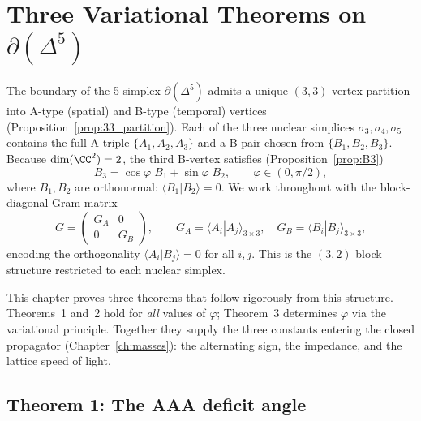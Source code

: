 \section{Three Variational Theorems on $\partial(\Delta^5)$}
\label{ch:variational_theorems}

The boundary of the 5-simplex $\partial(\Delta^5)$ admits a unique
$(3,3)$ vertex partition into A-type (spatial) and B-type (temporal)
vertices (Proposition~\ref{prop:33_partition}).  Each of the three
nuclear simplices $\sigma_3, \sigma_4, \sigma_5$ contains the full
A-triple $\{A_1, A_2, A_3\}$ and a B-pair chosen from
$\{B_1, B_2, B_3\}$.  Because $\dim(\CC^2) = 2$, the third B-vertex
satisfies (Proposition~\ref{prop:B3})
\begin{equation}\label{eq:B3_parametrize}
B_3 = \cos\varphi\; B_1 + \sin\varphi\; B_2,
\qquad \varphi \in (0, \pi/2),
\end{equation}
where $B_1, B_2$ are orthonormal: $\langle B_1 | B_2 \rangle = 0$.
We work throughout with the block-diagonal Gram matrix
\begin{equation}\label{eq:block_gram}
G = \begin{pmatrix} G_A & 0 \\ 0 & G_B \end{pmatrix},
\qquad
G_A = \langle A_i | A_j \rangle_{3\times 3},
\quad
G_B = \langle B_i | B_j \rangle_{3\times 3},
\end{equation}
encoding the orthogonality $\langle A_i | B_j \rangle = 0$ for all
$i, j$.  This is the $(3,2)$ block structure restricted to each
nuclear simplex.

This chapter proves three theorems that follow rigorously from this
structure.  Theorems~1 and~2 hold for \emph{all} values of $\varphi$;
Theorem~3 determines $\varphi$ via the variational principle.
Together they supply the three constants entering the closed propagator
(Chapter~\ref{ch:masses}): the alternating sign, the impedance, and
the lattice speed of light.

\subsection{Theorem 1: The AAA deficit angle}
\label{sec:thm_AAA}

